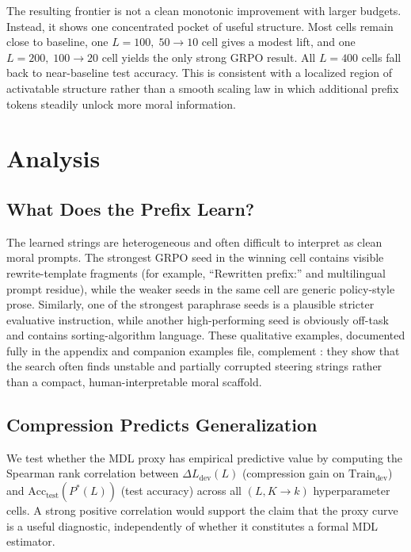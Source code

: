 \documentclass[preprint]{article}
\newcommand{\Ldev}{L_{\text{dev}}}
\newcommand{\Traindev}{\text{Train}_{\text{dev}}}
\newcommand{\Acctest}{\text{Acc}_{\text{test}}}
\begin{document}
The resulting frontier is not a clean monotonic improvement with larger budgets.
Instead, it shows one concentrated pocket of useful structure.
Most cells remain close to baseline, one $L{=}100,\;50{\to}10$ cell gives a modest lift, and one $L{=}200,\;100{\to}20$ cell yields the only strong GRPO result.
All $L{=}400$ cells fall back to near-baseline test accuracy.
This is consistent with a localized region of activatable structure rather than a smooth scaling law in which additional prefix tokens steadily unlock more moral information.

\section{Analysis}
\label{sec:analysis}

\subsection{What Does the Prefix Learn?}
\label{sec:what_prefix_learns}

The learned strings are heterogeneous and often difficult to interpret as clean moral prompts.
The strongest GRPO seed in the winning cell contains visible rewrite-template fragments (for example, ``Rewritten prefix:'' and multilingual prompt residue), while the weaker seeds in the same cell are generic policy-style prose.
Similarly, one of the strongest paraphrase seeds is a plausible stricter evaluative instruction, while another high-performing seed is obviously off-task and contains sorting-algorithm language.
These qualitative examples, documented fully in the appendix and companion examples file, complement : they show that the search often finds unstable and partially corrupted steering strings rather than a compact, human-interpretable moral scaffold.

\subsection{Compression Predicts Generalization}

We test whether the MDL proxy has empirical predictive value by computing the Spearman rank correlation between $\Delta\Ldev(L)$ (compression gain on $\Traindev$) and $\Acctest(P^*(L))$ (test accuracy) across all $(L, K{\to}k)$ hyperparameter cells.
A strong positive correlation would support the claim that the proxy curve is a useful diagnostic, independently of whether it constitutes a formal MDL estimator.
\end{document}
